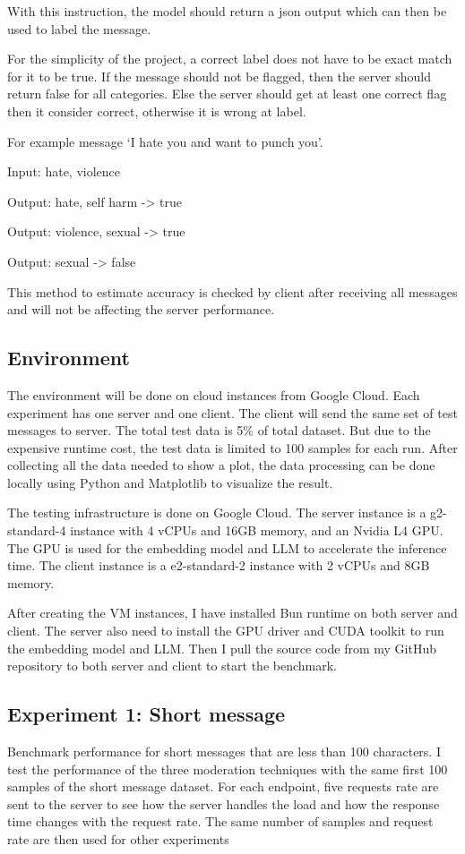 \documentclass[
	english,
	accentcolor=9c,
	type=intern,
	marginpar=false,
	11pt
]{tudapub}
\begin{document}
With this instruction, the model should return a json output which can then be used to label the message.

For the simplicity of the project, a correct label does not have to be exact match for it to be true.
If the message should not be flagged, then the server should return false for all categories.
Else the server should get at least one correct flag then it consider correct, otherwise it is wrong at label.

For example message `I hate you and want to punch you'.

Input: hate, violence

Output: hate, self harm -> true

Output: violence, sexual -> true

Output: sexual -> false

This method to estimate accuracy is checked by client after receiving all messages and will not be affecting the server performance.

\subsection{Environment}
The environment will be done on cloud instances from Google Cloud.
Each experiment has one server and one client.
The client will send the same set of test messages to server.
The total test data is 5\% of total dataset. But due to the expensive runtime cost, the test data is limited to 100 samples for each run.
After collecting all the data needed to show a plot, the data processing can be done locally using Python and Matplotlib to visualize the result.

The testing infrastructure is done on Google Cloud.
The server instance is a g2-standard-4 instance with 4 vCPUs and 16GB memory, and an Nvidia L4 GPU.
The GPU is used for the embedding model and LLM to accelerate the inference time.
The client instance is a e2-standard-2 instance with 2 vCPUs and 8GB memory.

After creating the VM instances, I have installed Bun runtime on both server and client.
The server also need to install the GPU driver and CUDA toolkit to run the embedding model and LLM.
Then I pull the source code from my GitHub repository to both server and client to start the benchmark.

\subsection{Experiment 1: Short message}
Benchmark performance for short messages that are less than 100 characters.
I test the performance of the three moderation techniques with the same first 100 samples of the short message dataset.
For each endpoint, five requests rate are sent to the server to see how the server handles the load and how the response time changes with the request rate.
The same number of samples and request rate are then used for other experiments
\end{document}
